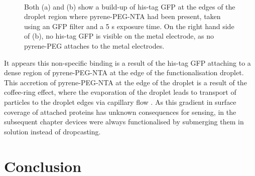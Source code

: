 \documentclass[
  a4paper,
]{scrbook}
\begin{document}
\begin{figure}
\begin{minipage}[t]{0.45\linewidth}
{{}

}

\end{minipage}%
%
\begin{minipage}[t]{0.01\linewidth}

{\centering 

~

}

\end{minipage}%

\caption[Fluorescence images showing the impact of the coffee-ring
effect on the surface distribution of fluorescent protein across a
carbon nanotube network device
post-functionalisation.]{\label{fig-GFP-coffee-ring}Both (a) and (b)
show a build-up of his-tag GFP at the edges of the droplet region where
pyrene-PEG-NTA had been present, taken using an GFP filter and a 5 s
exposure time. On the right hand side of (b), no his-tag GFP is visible
on the metal electrode, as no pyrene-PEG attaches to the metal
electrodes.}

\end{figure}

It appears this non-specific binding is a result of the his-tag GFP
attaching to a dense region of pyrene-PEG-NTA at the edge of the
functionalisation droplet. This accretion of pyrene-PEG-NTA at the edge
of the droplet is a result of the coffee-ring effect, where the
evaporation of the droplet leads to transport of particles to the
droplet edges via capillary flow \autocite{Deegan1997,Shimobayashi2018}.
As this gradient in surface coverage of attached proteins has unknown
consequences for sensing, in the subsequent chapter devices were always
functionalised by submerging them in solution instead of dropcasting.

\hypertarget{sec-conclusion}{%
\section{Conclusion}\label{sec-conclusion}}
\end{document}
